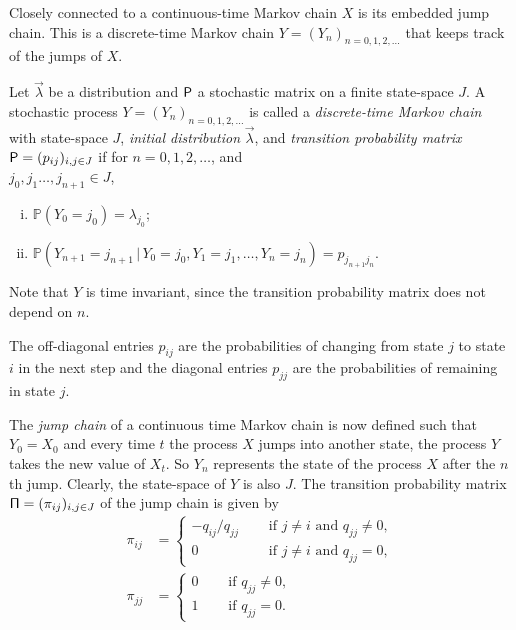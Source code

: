 \documentclass[smallextended]{svjour3}
\renewcommand{\P}{\mathbb{P}}
\begin{document}
Closely connected to a continuous-time Markov chain $X$ is its embedded jump chain.
This is a discrete-time Markov chain $Y=(Y_n)_{n=0,1,2,\ldots}$ that keeps track of the jumps of $X$.

\begin{definition}
Let $\vec{\lambda}$ be a distribution and $\mathsf{P}$ a stochastic matrix on a finite state-space $J$.
A stochastic process $Y=(Y_n)_{n=0,1,2,\ldots}$ is called a \emph{discrete-time Markov chain} with state-space $J$, \emph{initial distribution} $\vec{\lambda}$, and \emph{transition probability matrix} $\mathsf{P}=(p_{ij})_{i,j\in J}$ if for $n=0,1,2,\ldots$, and\\
$j_0,j_1\ldots,j_{n+1}\in J$,
\begin{enumerate}[(i)]
    \item $\P(Y_0=j_0)=\lambda_{j_0}$;
    \item $\P(Y_{n+1}=j_{n+1}\,|\,Y_0=j_0,Y_1=j_1,\ldots,Y_n=j_n)=p_{j_{n+1} j_n}$.
\end{enumerate}
\end{definition}
Note that $Y$ is time invariant, since the transition probability matrix does not depend on $n$.

The off-diagonal entries $p_{ij}$ are the probabilities of changing from state $j$ to state $i$ in the next step and the diagonal entries $p_{jj}$ are the probabilities of remaining in state $j$.

The \emph{jump chain} of a continuous time Markov chain is now defined such that $Y_0=X_0$ and every time $t$ the process $X$ jumps into another state, the process $Y$ takes the new value of $X_t$.
So $Y_n$ represents the state of the process $X$ after the $n$th jump.
Clearly, the state-space of $Y$ is also $J$.
The transition probability matrix $\mathsf{\Pi}=(\pi_{ij})_{i,j\in J}$ of the jump chain is given by
\begin{align*}
    \pi_{ij} &=
    \begin{cases}
        -q_{ij}/q_{jj}\quad & \text{ if }j\neq i\text{ and }q_{jj}\neq 0,\\
        0 & \text { if }j\neq i\text{ and }q_{jj}=0,
    \end{cases}\\
    \pi_{jj} &=
    \begin{cases}
        0\quad & \text{ if }q_{jj}\neq 0,\\
        1 &\text{ if }q_{jj}=0.
    \end{cases}
\end{align*}
\end{document}
